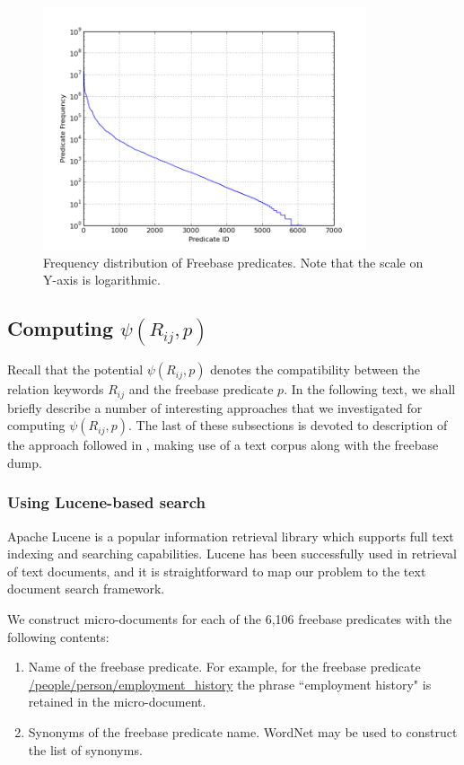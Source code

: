 \documentclass[a4paper, twoside, 12pt]{report}
\begin{document}
\begin{figure}[h] \label{preddist}
\centering
\includegraphics[width=0.85\textwidth]{./images/pred-freq}
\caption{Frequency distribution of Freebase predicates. Note that the scale on Y-axis is logarithmic.}
\end{figure}

\subsection{Computing $\psi(R_{ij},p)$}
Recall that the potential $\psi(R_{ij},p)$ denotes the compatibility between the relation keywords $R_{ij}$ and the freebase predicate $p$. In the following text, we shall briefly describe a number of interesting approaches that we investigated for computing $\psi(R_{ij}, p)$. The last of these subsections is devoted to description of the approach followed in \cite{joshknowledge}, making use of a text corpus along with the freebase dump.

\subsubsection{Using Lucene-based search}
Apache Lucene \cite{lucene2005high} is a popular information retrieval library which supports full text indexing and searching capabilities. Lucene has been successfully used in retrieval of text documents, and it is straightforward to map our problem to the text document search framework.

We construct micro-documents for each of the 6,106 freebase predicates with the following contents:
\begin{enumerate}
\item Name of the freebase predicate. For example, for the freebase predicate \url{/people/person/employment_history} the phrase ``employment history" is retained in the micro-document.
\item Synonyms of the freebase predicate name. WordNet may be used to construct the list of synonyms.
\end{enumerate}
\end{document}
